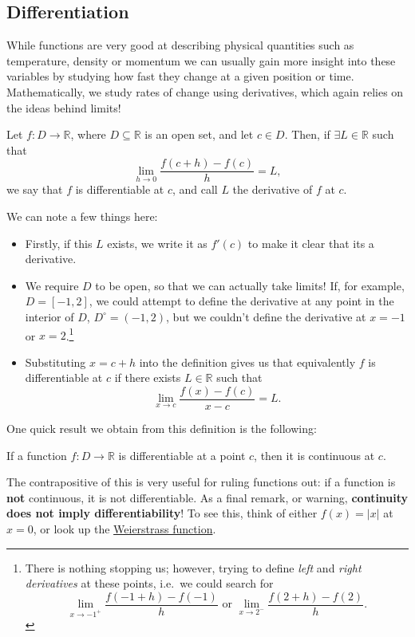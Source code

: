 \documentclass[
  12pt,
  a4paper]{extarticle}
\providecommand{\tightlist}{%
  \setlength{\itemsep}{0pt}\setlength{\parskip}{0pt}}
\theoremstyle{plain}
\theoremstyle{definition}
\theoremstyle{plain}
\theoremstyle{plain}
\theoremstyle{plain}
\theoremstyle{plain}
\theoremstyle{definition}
\theoremstyle{definition}
\theoremstyle{remark}
\theoremstyle{remark}
\let\BeginKnitrBlock\begin \let\EndKnitrBlock\end
\renewcommand{\;}{\,}
\begin{document}
\hypertarget{differentiation}{%
\subsection{Differentiation}\label{differentiation}}

While functions are very good at describing physical quantities such as temperature, density or momentum we can usually gain more insight into these variables by studying how fast they change at a given position or time. Mathematically, we study rates of change using derivatives, which again relies on the ideas behind limits!

\BeginKnitrBlock{definition}[Derivative]
{\label{def:def2} }Let \(f: D \to \mathbb{R}\), where \(D \subseteq \mathbb{R}\) is an open set, and let \(c \in D\). Then, if \(\exists L \in \mathbb{R}\) such that \[\lim_{h \to 0}\frac{f(c+h) - f(c)}{h} = L,\] we say that \(f\) is differentiable at \(c\), and call \(L\) the derivative of \(f\) at \(c\).
\EndKnitrBlock{definition}
We can note a few things here:

\begin{itemize}
\tightlist
\item
  Firstly, if this \(L\) exists, we write it as \(f'(c)\) to make it clear that its a derivative.
\item
  We require \(D\) to be open, so that we can actually take limits! If, for example, \(D = [-1,2]\), we could attempt to define the derivative at any point in the interior of \(D\), \(D^{\circ} = (-1,2)\), but we couldn't define the derivative at \(x = -1\) or \(x = 2\).\footnote{There is nothing stopping us; however, trying to define \emph{left} and \emph{right derivatives} at these points, i.e.~we could search for \[\lim_{x \to -1^{+}}\frac{f(-1+h) - f(-1)}{h}\;\;\text{or}\;\;\lim_{x \to 2^{-}}\frac{f(2+h) - f(2)}{h}.\]}
\item
  Substituting \(x = c+h\) into the definition gives us that equivalently \(f\) is differentiable at \(c\) if there exists \(L\in\mathbb{R}\) such that \[\lim_{x \to c}\frac{f(x) - f(c)}{x - c} = L.\]
\end{itemize}

One quick result we obtain from this definition is the following:
\BeginKnitrBlock{proposition}
{\label{prp:prop2} }If a function \(f:D \to \mathbb{R}\) is differentiable at a point \(c\), then it is continuous at \(c\).
\EndKnitrBlock{proposition}
The contrapositive of this is very useful for ruling functions out: if a function is \textbf{not} continuous, it is not differentiable. As a final remark, or warning, \textbf{continuity does not imply differentiability}! To see this, think of either \(f(x) = \lvert x \rvert\) at \(x = 0\), or look up the \href{https://en.wikipedia.org/wiki/Weierstrass_function}{Weierstrass function}.
\end{document}
